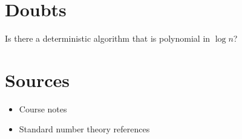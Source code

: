 \documentclass{article}
\begin{document}
\section{Doubts}

Is there a deterministic algorithm that is polynomial in $\log n$?

\section{Sources}

\begin{itemize}
    \item Course notes
    \item Standard number theory references
\end{itemize}
\end{document}
